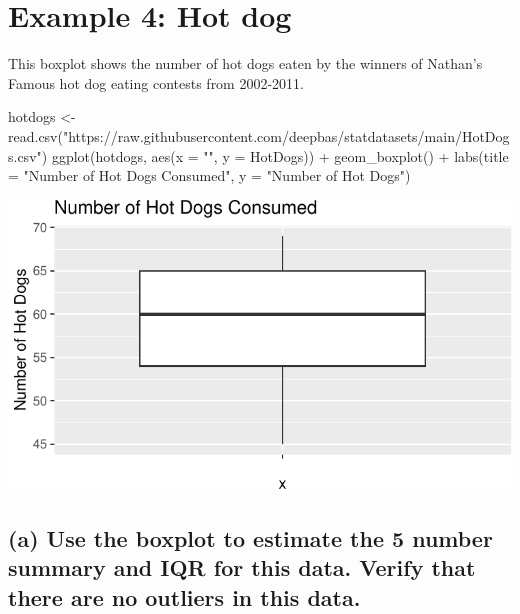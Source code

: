 \documentclass[
]{book}
\newenvironment{Shaded}{\begin{snugshade}}{\end{snugshade}}
\newcommand{\AttributeTok}[1]{\textcolor[rgb]{0.77,0.63,0.00}{#1}}
\newcommand{\FunctionTok}[1]{\textcolor[rgb]{0.00,0.00,0.00}{#1}}
\newcommand{\NormalTok}[1]{#1}
\newcommand{\OtherTok}[1]{\textcolor[rgb]{0.56,0.35,0.01}{#1}}
\newcommand{\SpecialCharTok}[1]{\textcolor[rgb]{0.00,0.00,0.00}{#1}}
\newcommand{\StringTok}[1]{\textcolor[rgb]{0.31,0.60,0.02}{#1}}
\begin{document}
\hypertarget{example-4-hot-dog}{%
\section{Example 4: Hot dog}\label{example-4-hot-dog}}

This boxplot shows the number of hot dogs eaten by the winners of Nathan's Famous hot dog eating contests from 2002-2011.

\begin{Shaded}
\begin{Highlighting}[]
\NormalTok{hotdogs }\OtherTok{\textless{}{-}} \FunctionTok{read.csv}\NormalTok{(}\StringTok{"https://raw.githubusercontent.com/deepbas/statdatasets/main/HotDogs.csv"}\NormalTok{)}
\FunctionTok{ggplot}\NormalTok{(hotdogs, }\FunctionTok{aes}\NormalTok{(}\AttributeTok{x =} \StringTok{""}\NormalTok{, }\AttributeTok{y =}\NormalTok{ HotDogs)) }\SpecialCharTok{+}
  \FunctionTok{geom\_boxplot}\NormalTok{() }\SpecialCharTok{+}
  \FunctionTok{labs}\NormalTok{(}\AttributeTok{title =} \StringTok{"Number of Hot Dogs Consumed"}\NormalTok{, }\AttributeTok{y =} \StringTok{"Number of Hot Dogs"}\NormalTok{) }
\end{Highlighting}
\end{Shaded}

\includegraphics[width=1\linewidth]{Class_Activity_5_files/figure-latex/unnamed-chunk-8-1}

\hypertarget{a-use-the-boxplot-to-estimate-the-5-number-summary-and-iqr-for-this-data.-verify-that-there-are-no-outliers-in-this-data.}{%
\subsection{(a) Use the boxplot to estimate the 5 number summary and IQR for this data. Verify that there are no outliers in this data.}\label{a-use-the-boxplot-to-estimate-the-5-number-summary-and-iqr-for-this-data.-verify-that-there-are-no-outliers-in-this-data.}}
\end{document}

